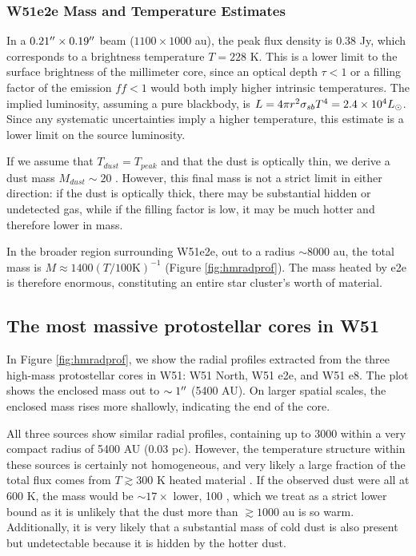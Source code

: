 \documentclass{aa}
\begin{document}
\subsubsection{W51e2e Mass and Temperature Estimates}
\label{sec:W51e2e}

In a $0.21\mbox{$^{\prime\prime}$}\times0.19\mbox{$^{\prime\prime}$}$ beam ($1100\times1000$ au), the peak flux
density is 0.38 Jy, which corresponds to a brightness temperature $T=228$ K.
This is a lower limit to the surface brightness of the millimeter core, since
an optical depth $\tau<1$ or a filling factor of the emission $ff<1$ would both
imply higher intrinsic temperatures.  The implied luminosity, assuming a pure
blackbody, is $L = 4\pi r^2 \sigma_{sb} T^4 = 2.4\times10^{4} L_{\odot}$.  Since any systematic
uncertainties imply a higher temperature, this estimate is a lower limit on the source
luminosity.

If we assume that $T_{dust} = T_{peak}$ and that the dust is optically thin, we
derive a dust mass $M_{dust}\sim20$ \msun.  However, this final mass is not a
strict limit in either direction: if the dust is optically thick, there may be
substantial hidden or undetected gas, while if the filling factor is low, it
may be much hotter and therefore lower in mass.

In the broader region surrounding W51e2e, out to a radius $\sim8000$ au, the
total mass is $M\approx1400 (T / 100 \mathrm{K})^{-1}$ \msun  (Figure
\ref{fig:hmradprof}).  The mass heated by e2e is therefore enormous,
constituting an entire star cluster's worth of material.


\subsection{The most massive protostellar cores in W51}
In Figure \ref{fig:hmradprof}, we show the radial profiles extracted from the
three high-mass protostellar cores in W51: W51 North, W51 e2e, and W51 e8.
The plot shows the enclosed mass out to $\sim1\mbox{$^{\prime\prime}$}$ (5400 AU).  On larger
spatial scales, the enclosed mass rises more shallowly, indicating the end of the
core. %

All three sources show similar radial profiles, containing up to 3000 \msun
within a very compact radius of 5400 AU (0.03 pc).  However, the temperature
structure within these sources is certainly not homogeneous, and very likely a
large fraction of the total flux comes from $T\gtrsim300$ K heated material
\citep[Section \ref{sec:temperature}; ][]{Goddi2016a}.  If the observed dust were
all at 600 K, the mass would be $\sim17\times$ lower, 100 \msun, which we treat
as a strict lower bound as it is unlikely that the dust more than $\gtrsim1000$
au is so warm.  Additionally, it is very likely that a substantial mass of cold
dust is also present but undetectable because it is hidden by the hotter dust.
\end{document}
